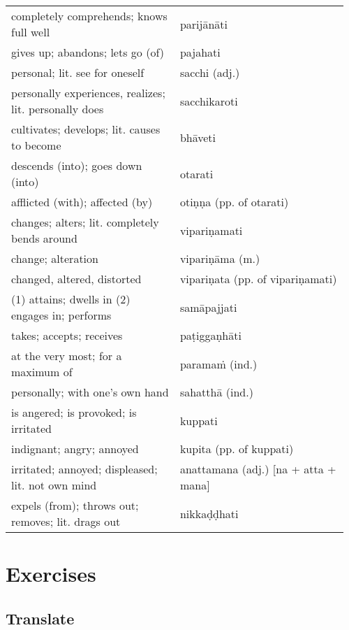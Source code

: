 \documentclass[11pt,oneside]{memoir}
\begin{document}
\begin{longtable}{L{0.48\linewidth} L{0.48\linewidth}}
completely comprehends; knows full well & parijānāti\\[0pt]
gives up; abandons; lets go (of) & pajahati\\[0pt]
personal; lit. see for oneself & sacchi (adj.)\\[0pt]
personally experiences, realizes; lit. personally does & sacchikaroti\\[0pt]
cultivates; develops; lit. causes to become & bhāveti\\[0pt]
descends (into); goes down (into) & otarati\\[0pt]
afflicted (with); affected (by) & otiṇṇa (pp. of otarati)\\[0pt]
changes; alters; lit. completely bends around & vipariṇamati\\[0pt]
change; alteration & vipariṇāma (m.)\\[0pt]
changed, altered, distorted & vipariṇata (pp. of vipariṇamati)\\[0pt]
(1) attains; dwells in (2) engages in; performs & samāpajjati\\[0pt]
takes; accepts; receives & paṭiggaṇhāti\\[0pt]
at the very most; for a maximum of & paramaṁ (ind.)\\[0pt]
personally; with one’s own hand & sahatthā (ind.)\\[0pt]
is angered; is provoked; is irritated & kuppati\\[0pt]
indignant; angry; annoyed & kupita (pp. of kuppati)\\[0pt]
irritated; annoyed; displeased; lit. not own mind & anattamana (adj.) [na + atta + mana]\\[0pt]
expels (from); throws out; removes; lit. drags out & nikkaḍḍhati\\[0pt]
\end{longtable}

\clearpage

\section{Exercises}
\label{sec:org8c33288}
\subsection{Translate}
\label{sec:orgd103e78}
\end{document}
